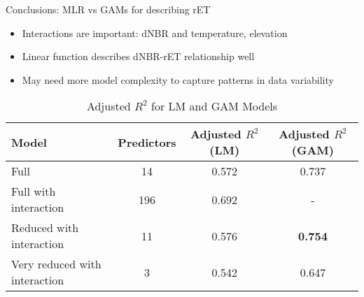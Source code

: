 \documentclass[aspectratio=169]{beamer}
\begin{document}
\begin{frame}{Conclusions: MLR vs GAMs for describing rET}

\begin{minipage}{\linewidth}
\begin{itemize}
 \item Interactions are important: dNBR and temperature, elevation
 \item Linear function describes dNBR-rET relationship well
 \item May need more model complexity to capture patterns in data variability
\end{itemize}
\end{minipage}
\vfill
\begin{minipage}{\linewidth}
\begin{table}[h]
\centering
\caption{Adjusted \( R^2 \) for LM and GAM Models}
\label{tab:adjusted_r2}
\renewcommand{\arraystretch}{1.1}  %
\setlength{\tabcolsep}{4pt}  %
\scriptsize
\begin{tabular}{|l|c|c|c|}
\hline
Model & Predictors & Adjusted \( R^2 \) (LM) & Adjusted \( R^2 \) (GAM) \\
\hline
Full   & 14          & 0.572  & 0.737 \\ %
\hline
Full with interaction & 196    & 0.692 & - \\ %
\hline
Reduced with interaction & 11 & 0.576   &  \bf{0.754} \\
\hline
Very reduced with interaction & 3 & 0.542 & 0.647 \\

\hline
\end{tabular}
\end{table}
\end{minipage}
\end{frame}
\end{document}
